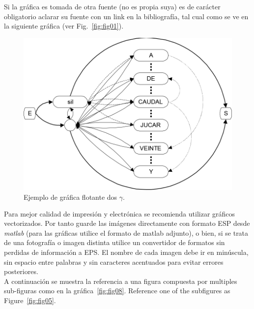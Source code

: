 \documentclass[
10pt,			%
letterpaper,	%
oneside,		%
headinclude, footinclude, %
BCOR5mm, 		%
]{scrartcl}
\begin{document}
Si la gráfica es tomada de otra fuente (no es propia suya) es de carácter obligatorio aclarar su fuente con un link en la bibliografía, tal cual como se ve en la siguiente gráfica (ver Fig.~\vref{fig:fig01}).

\begin{figure}[tbhp]
	\centerline{\includegraphics[scale=0.75]{fig03}}
	\caption[Ejemplo de gráfica flotante $\gamma$]{Ejemplo de gráfica flotante dos $\gamma$.} %
	\label{fig:fig03}
\end{figure}

Para mejor calidad de impresión y electrónica se recomienda utilizar gráficos vectorizados. Por tanto guarde las imágenes directamente con formato ESP desde \emph{matlab} (para las gráficas utilice el formato de matlab adjunto), o bien, si se trata de una fotografía o imagen distinta utilice un convertidor de formatos sin perdidas de información a EPS. El nombre de cada imagen debe ir en minúscula, sin espacio entre palabras y sin caracteres acentuados para evitar errores posteriores.\\
A continuación se muestra la referencia a una figura compuesta por multiples sub-figuras como en la gráfica~\vref{fig:fig08}. Reference one of the subfigures as Figure~\vref{fig:fig05}.
\end{document}
